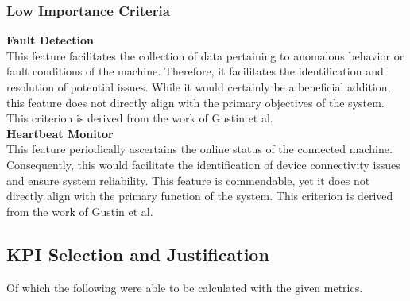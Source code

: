 \subsubsection{Low Importance Criteria}
\textbf{Fault Detection}\\
This feature facilitates the collection of data pertaining to anomalous behavior or fault conditions of the machine. Therefore, it facilitates the identification and resolution of potential issues. While it would certainly be a beneficial addition, this feature does not directly align with the primary objectives of the system.
This criterion is derived from the work of Gustin et al.\\
\textbf{Heartbeat Monitor}\\
This feature periodically ascertains the online status of the connected machine. Consequently, this would facilitate the identification of device connectivity issues and ensure system reliability.
This feature is commendable, yet it does not directly align with the primary function of the system.
This criterion is derived from the work of Gustin et al.







\subsection{KPI Selection and Justification}
 Of which the following were able to be calculated with the given metrics.
\\